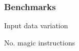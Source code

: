 
\begin{frame}[allowframebreaks]
\frametitle{Benchmarks}



\framebreak 

\begin{block}{Input data variation}
\center
\resizebox{\linewidth}{!}{%
	
}
\end{block}

\begin{block}{No. magic instructions}
\center
\resizebox{\linewidth}{!}{%
	
}
\end{block}
	
\end{frame}